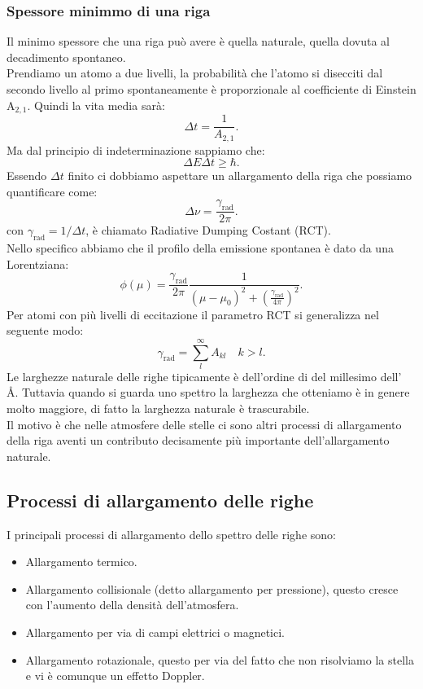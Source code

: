 \subsubsection{Spessore minimmo di una riga}
\label{subsubsec:Spessore minimmo di una riga}
Il minimo spessore che una riga può avere è quella naturale, quella dovuta al decadimento spontaneo.\\
Prendiamo un atomo a due livelli, la probabilità che l'atomo si disecciti dal secondo livello al primo spontaneamente è proporzionale al coefficiente di Einstein A$_{2,1}$. Quindi la vita media sarà:
\[
	\Delta t = \frac{1}{A_{2,1}} 
.\] 
Ma dal principio di indeterminazione sappiamo che:
\[
	\Delta E\Delta t \ge \hbar
.\] 
Essendo $\Delta t$ finito ci dobbiamo aspettare un allargamento della riga che possiamo quantificare come:
\[
	\Delta \nu = \frac{\gamma _{\text{rad}}}{2\pi}
.\] 
con $\gamma _{\text{rad}}= 1 /\Delta t$, è chiamato Radiative Dumping Costant (RCT).\\
Nello specifico abbiamo che il profilo della emissione spontanea è dato da una Lorentziana:
\[
	\phi ( \mu ) = \frac{\gamma _{\text{rad}}}{2\pi}\frac{1}{\left( \mu -\mu_0 \right) ^2 + \left( \frac{\gamma _{\text{rad}}}{4\pi} \right) ^2}
.\] 
Per atomi con più livelli di eccitazione il parametro RCT si generalizza nel seguente modo:
\[
	\gamma _{\text{rad}} = \sum_{l}^{\infty} A_{kl} \quad k > l
.\] 
Le larghezze naturale delle righe tipicamente è dell'ordine di del millesimo dell' \AA. Tuttavia quando si guarda uno spettro la larghezza che otteniamo è in genere molto maggiore, di fatto la larghezza naturale è trascurabile.\\
Il motivo è che nelle atmosfere delle stelle ci sono altri processi di allargamento della riga aventi un contributo decisamente più importante dell'allargamento naturale.
\subsection{Processi di allargamento delle righe}
\label{subsubsec:Processi di allargamento delle righe}
I principali processi di allargamento dello spettro delle righe sono:
\begin{itemize}
	\item Allargamento termico.
	\item Allargamento collisionale (detto allargamento per pressione), questo cresce con l'aumento della densità dell'atmosfera.
	\item Allargamento per via di campi elettrici o magnetici.
	\item Allargamento rotazionale, questo per via del fatto che non risolviamo la stella e vi è comunque un effetto Doppler. 
\end{itemize}
